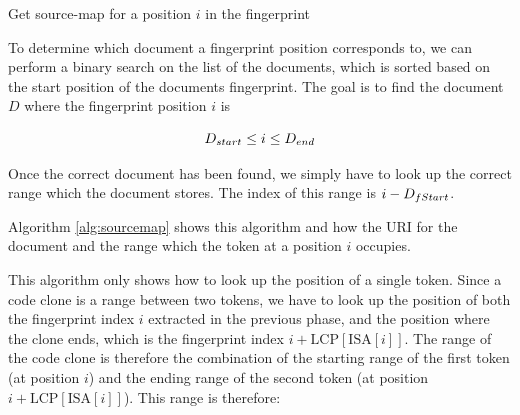 \begin{algorithm}[htp!]
  \SetAlgoLined\DontPrintSemicolon

  \vspace{0.5cm}
  \caption{Get source-map for a position $i$ in the fingerprint}
  \label{alg:sourcemap}
\end{algorithm}

To determine which document a fingerprint position corresponds to, we can perform a binary
search on the list of the documents, which is sorted based on the start position of the
documents fingerprint. The goal is to find the document $D$ where the fingerprint position $i$
is 

$$
{{D}_{start}} \leq i \leq {{D}_{end}}
$$

Once the correct document has been found, we simply have to look up the correct range
which the document stores. The index of this range is $i -
{{D}_{fStart}}$.

Algorithm \ref{alg:sourcemap} shows this algorithm and how the URI for the document and
the range which the token at a position $i$ occupies.

This algorithm only shows how to look up the position of a single token. Since a code
clone is a range between two tokens, we have to look up the position of both the
fingerprint index $i$ extracted in the previous phase, and the position where the clone
ends, which is the fingerprint index $i + \text{LCP}[\text{ISA}[i]]$. The range of the
code clone is therefore the combination of the starting range of the first token (at
position $i$) and the ending range of the second token (at position $i +
\text{LCP}[\text{ISA}[i]]$). This range is therefore:

